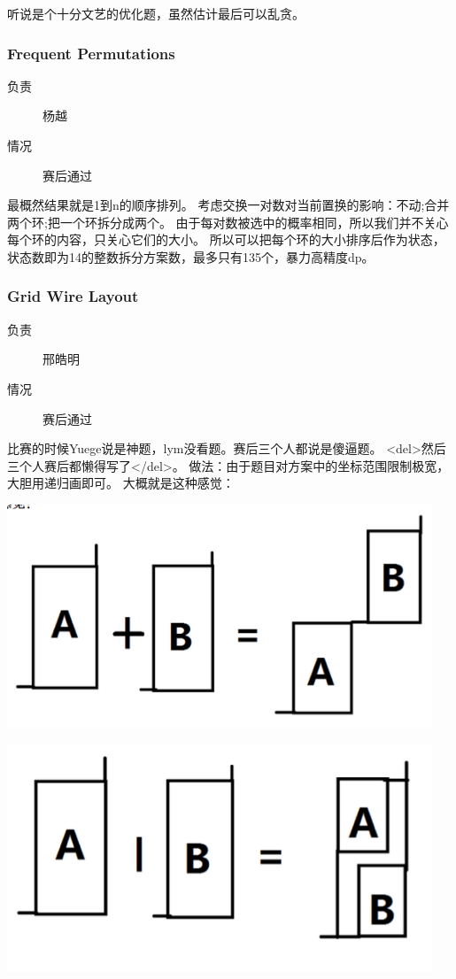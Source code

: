\documentclass[a4paper, 11pt, nofonts, nocap, fancyhdr]{ctexart}
\newcommand{\problem}[1]{\subsubsection{#1}}
\begin{document}
听说是个十分文艺的优化题，虽然估计最后可以乱贪。

\problem{Frequent Permutations}

\begin{description}
\item[负责] 杨越
\item[情况] 赛后通过
\end{description}

最概然结果就是1到n的顺序排列。
考虑交换一对数对当前置换的影响：不动;合并两个环;把一个环拆分成两个。
由于每对数被选中的概率相同，所以我们并不关心每个环的内容，只关心它们的大小。
所以可以把每个环的大小排序后作为状态，状态数即为14的整数拆分方案数，最多只有135个，暴力高精度dp。

\problem{Grid Wire Layout}

\begin{description}
\item[负责] 邢皓明
\item[情况] 赛后通过
\end{description}

比赛的时候Yuege说是神题，lym没看题。赛后三个人都说是傻逼题。
<del>然后三个人赛后都懒得写了</del>。
做法：由于题目对方案中的坐标范围限制极宽，大胆用递归画即可。
大概就是这种感觉：

\includegraphics[width=5in]{pic/ASC43_pic1.png}

\includegraphics[width=5in]{pic/ASC43_pic2.png}
\end{document}
